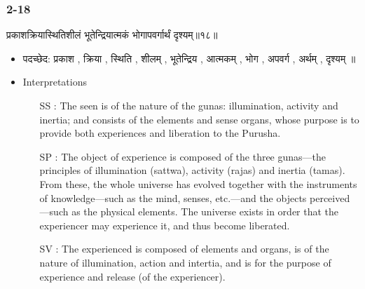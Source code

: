 \begin{frame}[fragile]\frametitle{2-18}
\begin{sanskrit}
प्रकाशक्रियास्थितिशीलं भूतेन्द्रियात्मकं भोगापवर्गार्थं दृश्यम्॥१८॥
\end{sanskrit}

	\begin{itemize}
	\item पदच्छेद: प्रकाश , क्रिया , स्थिति , शीलम् , भूतेन्द्रिय , आत्मकम् , भोग , अपवर्ग , अर्थम् , दृश्यम् ॥
	\item Interpretations
		\begin{itemize}
		\item [SS]: The seen is of the nature of the gunas: illumination, activity and inertia; and consists of the elements and sense organs, whose purpose is to provide both experiences and liberation to the Purusha.
		\item [SP]: The object of experience is composed of the three gunas—the principles of illumination (sattwa), activity (rajas) and inertia (tamas). From these, the whole universe has evolved together with the instruments of knowledge—such as the mind, senses, etc.—and the objects perceived—such as the physical elements. The universe exists in order that the experiencer may experience it, and thus become liberated.
		\item [SV]: The experienced is composed of elements and organs, is of the nature of illumination, action and intertia, and is for the purpose of experience and release (of the experiencer).
		\end{itemize}
	\end{itemize}
\end{frame}


